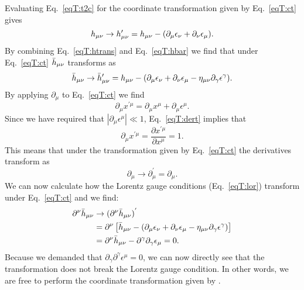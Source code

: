 Evaluating Eq.~\ref{eqT:t2c} for the coordinate transformation given by Eq.~\ref{eqT:ct} gives
\begin{equation} \label{eqT:htrans}
h_{\mu\nu} \rightarrow h'_{\mu\nu} = h_{\mu\nu} - (\partial_{\mu} \epsilon_{\nu} + \partial_{\nu} \epsilon_{\mu}). 
\end{equation}
By combining Eq.~\ref{eqT:htrans} and Eq.~\ref{eqT:hbar} we find that under Eq.~\ref{eqT:ct} $\bar{h}_{\mu\nu}$ transforms as
\begin{equation} \label{eqT:hbartrans}
\bar{h}_{\mu\nu} \rightarrow \bar{h}'_{\mu\nu} =  {h}_{\mu\nu} - (\partial_{\mu} \epsilon_{\nu} + \partial_{\nu} \epsilon_{\mu} - \eta_{\mu\nu}\partial_{\gamma} \epsilon^{\gamma}). 
\end{equation}
By applying  $\partial_{\mu}$ to Eq.~\ref{eqT:ct} we find
\begin{equation} \label{eqT:dert}
\partial_{\mu} x^{'\mu} = \partial_{\mu} x^{\mu} + \partial_{\mu} \epsilon^{\mu}.
\end{equation}
Since we have required that $|\partial_{\mu} \epsilon^{\mu}| \ll 1$,  Eq.~\ref{eqT:dert} implies that
\begin{equation}
\partial_{\mu} x^{'\mu} = \frac{\partial x^{'\mu} }{\partial x^{\mu}} = 1.
\end{equation}
This means that under the transformation given by Eq.~\ref{eqT:ct} the derivatives
transform as
\begin{equation} \label{eqT:dert2}
\partial_{\mu} \rightarrow \partial_{\mu}^{'} = \partial_{\mu}.
\end{equation}
We can now calculate how the Lorentz gauge conditions (Eq.~\ref{eqT:lor}) transform under Eq.~\ref{eqT:ct} and we
find:
\begin{align} \label{eqT:lort}
\partial^{\nu} \bar{h}_{\mu\nu} & \rightarrow (\partial^{\nu} \bar{h}_{\mu\nu})^{'} \\ \nonumber
&= \partial^{\nu} \left [ \bar{h}_{\mu\nu} - (\partial_{\mu} \epsilon_{\nu} + \partial_{\nu} \epsilon_{\mu} - \eta_{\mu\nu}\partial_{\gamma} \epsilon^{\gamma}) \right ] \\
&= \partial^{\nu} \bar{h}_{\mu\nu} - \partial^{\gamma} \partial_{\gamma} \epsilon_{\mu} = 0. \nonumber
\end{align}
Because we demanded that $\partial_{\gamma} \partial^{\gamma} \epsilon^{\mu} = 0$, we can now directly see 
that the transformation does not break the Lorentz gauge condition. In other words, we
are free to perform the coordinate transformation given by .

